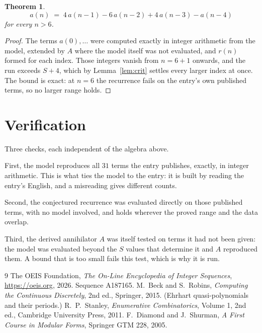 \documentclass[11pt,a4paper]{article}
\theoremstyle{plain}
\newtheorem{theorem}{Theorem}
\theoremstyle{definition}
\begin{document}
\begin{theorem}
\[
a(n)\;=\;4\,a(n-1) - 6\,a(n-2) + 4\,a(n-3) - a(n-4)
\]
for every $n>6$.
\end{theorem}

\begin{proof}
The terms $a(0),\dots$ were computed exactly in integer arithmetic from the model, extended by
$A$ where the model itself was not evaluated, and $r(n)$ formed for each index. Those integers
vanish from $n=6+1$ onwards, and the run exceeds $S+4$, which by
Lemma~\ref{lem:crit} settles every larger index at once. The bound is exact: at $n=6$ the recurrence fails on the entry's own published terms, so no larger range holds.
\end{proof}

\section{Verification}

Three checks, each independent of the algebra above.

First, the model reproduces all $31$ terms the entry publishes, exactly, in integer
arithmetic. This is what ties the model to the entry: it is built by reading the entry's
English, and a misreading gives different counts.

Second, the conjectured recurrence was evaluated directly on those published terms, with no
model involved, and holds wherever the proved range and the data overlap.

Third, the derived annihilator $A$ was itself tested on terms it had not been given: the model
was evaluated beyond the $S$ values that determine it and $A$ reproduced them. A bound that is
too small fails this test, which is why it is run.

\begin{thebibliography}{9}
 The OEIS Foundation, \emph{The On-Line Encyclopedia of Integer
Sequences}, \url{https://oeis.org}, 2026. Sequence A187165.
 M.~Beck and S.~Robins, \emph{Computing the Continuous Discretely},
2nd ed., Springer, 2015. (Ehrhart quasi-polynomials and their periods.)
 R.~P.~Stanley, \emph{Enumerative Combinatorics}, Volume 1, 2nd ed.,
Cambridge University Press, 2011.
 F.~Diamond and J.~Shurman, \emph{A First Course in Modular Forms},
Springer GTM 228, 2005.
\end{thebibliography}
\end{document}
